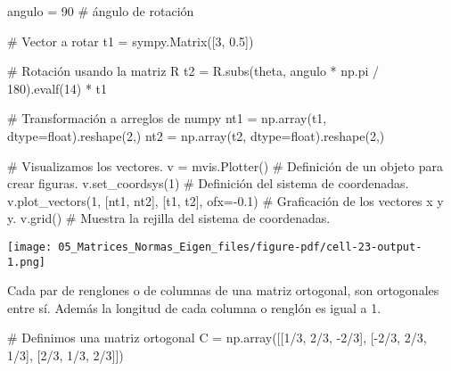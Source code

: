 \documentclass[
  letterpaper,
  DIV=11,
  numbers=noendperiod]{scrreprt}
\newenvironment{Shaded}{\begin{snugshade}}{\end{snugshade}}
\newcommand{\BuiltInTok}[1]{\textcolor[rgb]{0.00,0.23,0.31}{#1}}
\newcommand{\CommentTok}[1]{\textcolor[rgb]{0.37,0.37,0.37}{#1}}
\newcommand{\DecValTok}[1]{\textcolor[rgb]{0.68,0.00,0.00}{#1}}
\newcommand{\FloatTok}[1]{\textcolor[rgb]{0.68,0.00,0.00}{#1}}
\newcommand{\NormalTok}[1]{\textcolor[rgb]{0.00,0.23,0.31}{#1}}
\newcommand{\OperatorTok}[1]{\textcolor[rgb]{0.37,0.37,0.37}{#1}}
\newcommand{\StringTok}[1]{\textcolor[rgb]{0.13,0.47,0.30}{#1}}
\begin{document}
\begin{Shaded}
\begin{Highlighting}[]
\NormalTok{angulo }\OperatorTok{=} \DecValTok{90} \CommentTok{\# ángulo de rotación}

\CommentTok{\# Vector a rotar}
\NormalTok{t1 }\OperatorTok{=}\NormalTok{ sympy.Matrix([}\DecValTok{3}\NormalTok{, }\FloatTok{0.5}\NormalTok{])}

\CommentTok{\# Rotación usando la matriz R}
\NormalTok{t2 }\OperatorTok{=}\NormalTok{ R.subs(}\StringTok{\textquotesingle{}theta\textquotesingle{}}\NormalTok{, angulo }\OperatorTok{*}\NormalTok{ np.pi }\OperatorTok{/} \DecValTok{180}\NormalTok{).evalf(}\DecValTok{14}\NormalTok{) }\OperatorTok{*}\NormalTok{ t1}

\CommentTok{\# Transformación a arreglos de numpy}
\NormalTok{nt1 }\OperatorTok{=}\NormalTok{ np.array(t1, dtype}\OperatorTok{=}\BuiltInTok{float}\NormalTok{).reshape(}\DecValTok{2}\NormalTok{,)}
\NormalTok{nt2 }\OperatorTok{=}\NormalTok{ np.array(t2, dtype}\OperatorTok{=}\BuiltInTok{float}\NormalTok{).reshape(}\DecValTok{2}\NormalTok{,)}

\CommentTok{\# Visualizamos los vectores.}
\NormalTok{v }\OperatorTok{=}\NormalTok{ mvis.Plotter()  }\CommentTok{\# Definición de un objeto para crear figuras.}
\NormalTok{v.set\_coordsys(}\DecValTok{1}\NormalTok{)   }\CommentTok{\# Definición del sistema de coordenadas.}
\NormalTok{v.plot\_vectors(}\DecValTok{1}\NormalTok{, [nt1, nt2], [}\StringTok{\textquotesingle{}t1\textquotesingle{}}\NormalTok{, }\StringTok{\textquotesingle{}t2\textquotesingle{}}\NormalTok{], ofx}\OperatorTok{={-}}\FloatTok{0.1}\NormalTok{) }\CommentTok{\# Graficación de los vectores \textquotesingle{}x\textquotesingle{} y \textquotesingle{}y\textquotesingle{}.}
\NormalTok{v.grid()  }\CommentTok{\# Muestra la rejilla del sistema de coordenadas.}
\end{Highlighting}
\end{Shaded}

\texttt{[image: 05\_Matrices\_Normas\_Eigen\_files/figure-pdf/cell-23-output-1.png]}

Cada par de renglones o de columnas de una matriz ortogonal, son
ortogonales entre sí. Además la longitud de cada columna o renglón es
igual a 1.

\begin{Shaded}
\begin{Highlighting}[]
\CommentTok{\# Definimos una matriz ortogonal}
\NormalTok{C }\OperatorTok{=}\NormalTok{ np.array([[}\DecValTok{1}\OperatorTok{/}\DecValTok{3}\NormalTok{, }\DecValTok{2}\OperatorTok{/}\DecValTok{3}\NormalTok{, }\OperatorTok{{-}}\DecValTok{2}\OperatorTok{/}\DecValTok{3}\NormalTok{],}
\NormalTok{              [}\OperatorTok{{-}}\DecValTok{2}\OperatorTok{/}\DecValTok{3}\NormalTok{, }\DecValTok{2}\OperatorTok{/}\DecValTok{3}\NormalTok{, }\DecValTok{1}\OperatorTok{/}\DecValTok{3}\NormalTok{],}
\NormalTok{              [}\DecValTok{2}\OperatorTok{/}\DecValTok{3}\NormalTok{, }\DecValTok{1}\OperatorTok{/}\DecValTok{3}\NormalTok{, }\DecValTok{2}\OperatorTok{/}\DecValTok{3}\NormalTok{]])}
\end{Highlighting}
\end{Shaded}
\end{document}
